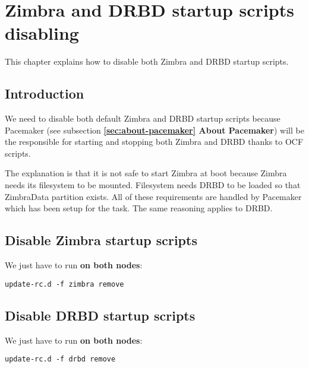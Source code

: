 

\chapter{Zimbra and DRBD startup scripts disabling}
\label{chap:zimbra-drbd-startup-script-disabling}
This chapter explains how to disable both Zimbra and DRBD startup scripts.

\section {Introduction}
We need to disable both default Zimbra and DRBD startup scripts because Pacemaker (see subsection \textbf{\ref{sec:about-pacemaker} About Pacemaker}) will be the responsible for starting and stopping both Zimbra and DRBD thanks to OCF scripts.

The explanation is that it is not safe to start Zimbra at boot because Zimbra needs its filesystem to be mounted. Filesystem needs DRBD to be loaded so that ZimbraData partition exists. All of these requirements are handled by Pacemaker which has been setup for the task. The same reasoning applies to DRBD.

\section {Disable Zimbra startup scripts}
We just have to run \textbf{on both nodes}:
\begin{verbatim}
update-rc.d -f zimbra remove
\end{verbatim}

\section {Disable DRBD startup scripts}
We just have to run \textbf{on both nodes}:
\begin{verbatim}
update-rc.d -f drbd remove
\end{verbatim}
